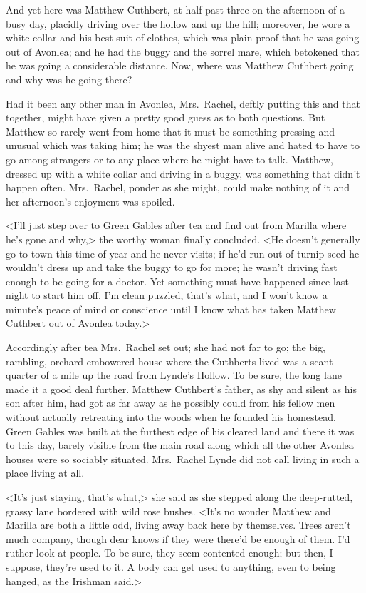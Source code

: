 And yet here was Matthew Cuthbert, at half-past three on the afternoon of a busy day, placidly driving over the hollow and up the hill; moreover, he wore a white collar and his best suit of clothes, which was plain proof that he was going out of Avonlea; and he had the buggy and the sorrel mare, which betokened that he was going a considerable distance. Now, where was Matthew Cuthbert going and why was he going there?

Had it been any other man in Avonlea, Mrs.~Rachel, deftly putting this and that together, might have given a pretty good guess as to both questions. But Matthew so rarely went from home that it must be something pressing and unusual which was taking him; he was the shyest man alive and hated to have to go among strangers or to any place where he might have to talk. Matthew, dressed up with a white collar and driving in a buggy, was something that didn't happen often. Mrs.~Rachel, ponder as she might, could make nothing of it and her afternoon's enjoyment was spoiled.

<I'll just step over to Green Gables after tea and find out from Marilla where he's gone and why,> the worthy woman finally concluded. <He doesn't generally go to town this time of year and he never visits; if he'd run out of turnip seed he wouldn't dress up and take the buggy to go for more; he wasn't driving fast enough to be going for a doctor. Yet something must have happened since last night to start him off. I'm clean puzzled, that's what, and I won't know a minute's peace of mind or conscience until I know what has taken Matthew Cuthbert out of Avonlea today.>

Accordingly after tea Mrs.~Rachel set out; she had not far to go; the big, rambling, orchard-embowered house where the Cuthberts lived was a scant quarter of a mile up the road from Lynde's Hollow. To be sure, the long lane made it a good deal further. Matthew Cuthbert's father, as shy and silent as his son after him, had got as far away as he possibly could from his fellow men without actually retreating into the woods when he founded his homestead. Green Gables was built at the furthest edge of his cleared land and there it was to this day, barely visible from the main road along which all the other Avonlea houses were so sociably situated. Mrs.~Rachel Lynde did not call living in such a place living at all.

<It's just staying, that's what,> she said as she stepped along the deep-rutted, grassy lane bordered with wild rose bushes. <It's no wonder Matthew and Marilla are both a little odd, living away back here by themselves. Trees aren't much company, though dear knows if they were there'd be enough of them. I'd ruther look at people. To be sure, they seem contented enough; but then, I suppose, they're used to it. A body can get used to anything, even to being hanged, as the Irishman said.>

